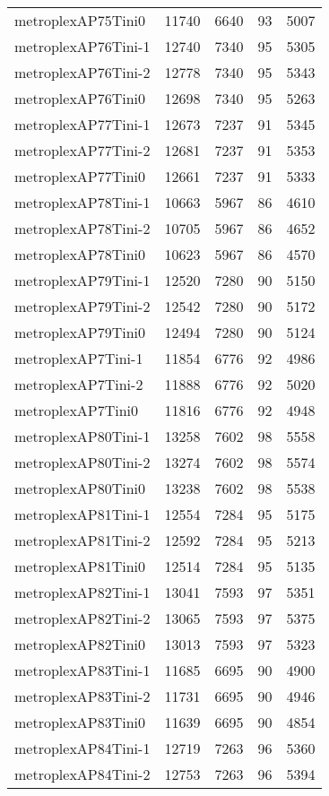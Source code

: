 \begin{longtable}{lrrrr}
metroplexAP75Tini0 & 11740 & 6640 & 93 & 5007 \\
metroplexAP76Tini-1 & 12740 & 7340 & 95 & 5305 \\
metroplexAP76Tini-2 & 12778 & 7340 & 95 & 5343 \\
metroplexAP76Tini0 & 12698 & 7340 & 95 & 5263 \\
metroplexAP77Tini-1 & 12673 & 7237 & 91 & 5345 \\
metroplexAP77Tini-2 & 12681 & 7237 & 91 & 5353 \\
metroplexAP77Tini0 & 12661 & 7237 & 91 & 5333 \\
metroplexAP78Tini-1 & 10663 & 5967 & 86 & 4610 \\
metroplexAP78Tini-2 & 10705 & 5967 & 86 & 4652 \\
metroplexAP78Tini0 & 10623 & 5967 & 86 & 4570 \\
metroplexAP79Tini-1 & 12520 & 7280 & 90 & 5150 \\
metroplexAP79Tini-2 & 12542 & 7280 & 90 & 5172 \\
metroplexAP79Tini0 & 12494 & 7280 & 90 & 5124 \\
metroplexAP7Tini-1 & 11854 & 6776 & 92 & 4986 \\
metroplexAP7Tini-2 & 11888 & 6776 & 92 & 5020 \\
metroplexAP7Tini0 & 11816 & 6776 & 92 & 4948 \\
metroplexAP80Tini-1 & 13258 & 7602 & 98 & 5558 \\
metroplexAP80Tini-2 & 13274 & 7602 & 98 & 5574 \\
metroplexAP80Tini0 & 13238 & 7602 & 98 & 5538 \\
metroplexAP81Tini-1 & 12554 & 7284 & 95 & 5175 \\
metroplexAP81Tini-2 & 12592 & 7284 & 95 & 5213 \\
metroplexAP81Tini0 & 12514 & 7284 & 95 & 5135 \\
metroplexAP82Tini-1 & 13041 & 7593 & 97 & 5351 \\
metroplexAP82Tini-2 & 13065 & 7593 & 97 & 5375 \\
metroplexAP82Tini0 & 13013 & 7593 & 97 & 5323 \\
metroplexAP83Tini-1 & 11685 & 6695 & 90 & 4900 \\
metroplexAP83Tini-2 & 11731 & 6695 & 90 & 4946 \\
metroplexAP83Tini0 & 11639 & 6695 & 90 & 4854 \\
metroplexAP84Tini-1 & 12719 & 7263 & 96 & 5360 \\
metroplexAP84Tini-2 & 12753 & 7263 & 96 & 5394 \\

\end{longtable}
